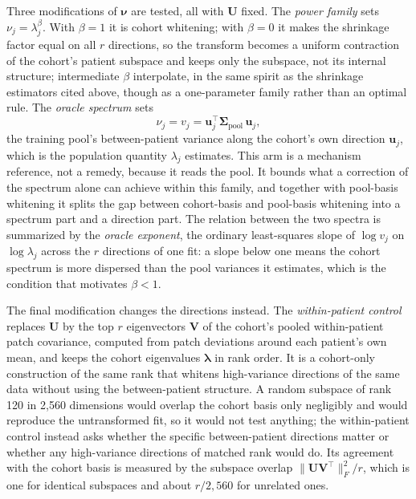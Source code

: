 \documentclass[11pt]{article}
\begin{document}
Three modifications of $\boldsymbol\nu$ are tested, all with $\mathbf U$ fixed. The \emph{power family} sets $\nu_j=\lambda_j^\beta$. With $\beta=1$ it is cohort whitening; with $\beta=0$ it makes the shrinkage factor equal on all $r$ directions, so the transform becomes a uniform contraction of the cohort's patient subspace and keeps only the subspace, not its internal structure; intermediate $\beta$ interpolate, in the same spirit as the shrinkage estimators cited above, though as a one-parameter family rather than an optimal rule. The \emph{oracle spectrum} sets
\begin{equation}
  \nu_j=v_j=\mathbf u_j^\top\boldsymbol\Sigma_{\text{pool}}\,\mathbf u_j ,
  \label{eq:oracle}
\end{equation}
\noindent the training pool's between-patient variance along the cohort's own direction $\mathbf u_j$, which is the population quantity $\lambda_j$ estimates. This arm is a mechanism reference, not a remedy, because it reads the pool. It bounds what a correction of the spectrum alone can achieve within this family, and together with pool-basis whitening it splits the gap between cohort-basis and pool-basis whitening into a spectrum part and a direction part. The relation between the two spectra is summarized by the \emph{oracle exponent}, the ordinary least-squares slope of $\log v_j$ on $\log\lambda_j$ across the $r$ directions of one fit: a slope below one means the cohort spectrum is more dispersed than the pool variances it estimates, which is the condition that motivates $\beta<1$.

The final modification changes the directions instead. The \emph{within-patient control} replaces $\mathbf U$ by the top $r$ eigenvectors $\mathbf V$ of the cohort's pooled within-patient patch covariance, computed from patch deviations around each patient's own mean, and keeps the cohort eigenvalues $\boldsymbol\lambda$ in rank order. It is a cohort-only construction of the same rank that whitens high-variance directions of the same data without using the between-patient structure. A random subspace of rank 120 in 2,560 dimensions would overlap the cohort basis only negligibly and would reproduce the untransformed fit, so it would not test anything; the within-patient control instead asks whether the specific between-patient directions matter or whether any high-variance directions of matched rank would do. Its agreement with the cohort basis is measured by the subspace overlap $\lVert\mathbf U\mathbf V^\top\rVert_F^2/r$, which is one for identical subspaces and about $r/2{,}560$ for unrelated ones.
\end{document}
